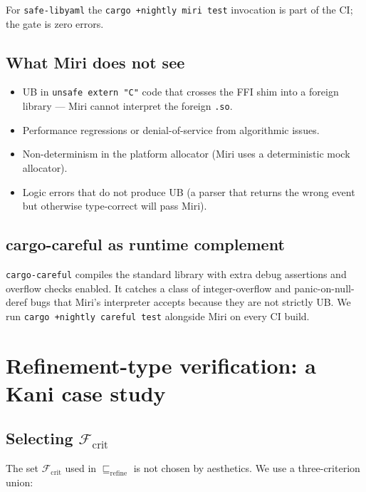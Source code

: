 \documentclass[12pt]{article}
\theoremstyle{definition}
\theoremstyle{remark}
\begin{document}
For \texttt{safe-libyaml} the \texttt{cargo +nightly miri test}
invocation is part of the CI; the gate is zero errors.

\subsection{What Miri does not see}

\begin{itemize}
\item UB in \texttt{unsafe extern "C"} code that crosses the FFI shim
into a foreign library --- Miri cannot interpret the foreign \texttt{.so}.
\item Performance regressions or denial-of-service from algorithmic
issues.
\item Non-determinism in the platform allocator (Miri uses a
deterministic mock allocator).
\item Logic errors that do not produce UB (a parser that returns the
wrong event but otherwise type-correct will pass Miri).
\end{itemize}

\subsection{cargo-careful as runtime complement}

\texttt{cargo-careful} \cite{ralfj2023careful} compiles the standard
library with extra debug assertions and overflow checks enabled. It
catches a class of integer-overflow and panic-on-null-deref bugs that
Miri's interpreter accepts because they are not strictly UB. We run
\texttt{cargo +nightly careful test} alongside Miri on every CI build.

\section{Refinement-type verification: a Kani case study}
\label{sec:kani}

\subsection{Selecting $\mathcal{F}_{\mathrm{crit}}$}
\label{sec:fcrit}

The set $\mathcal{F}_{\mathrm{crit}}$ used in
$\sqsubseteq_{\mathrm{refine}}$ is not chosen by aesthetics. We use a
three-criterion union:
\end{document}
